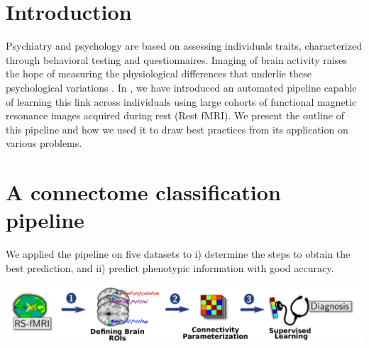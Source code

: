 \documentclass[portrait,a0,final]{a0poster} %
\begin{document}

\vspace{0.04\linewidth}

\centering
\Large %
\sffamily %


\begin{minipage}{0.98\linewidth}

\begin{minipage}[t]{0.48\linewidth}
\setlength{\parindent}{10mm} %













\section{Introduction}
Psychiatry and psychology are based on assessing individuals traits,
characterized through
behavioral testing and questionnaires. Imaging of brain activity raises the
hope of measuring
the physiological differences that underlie these psychological variations
\cite{miller}. In \cite{abraham}, we have
introduced an automated pipeline capable of learning this link across
individuals using large
cohorts of functional magnetic resonance images acquired during rest (Rest
fMRI). We present the outline of this pipeline
and how we used it to draw best practices from its application on various problems.


\vspace{0.8\sectionspace}
\section{A connectome classification pipeline}
We applied the pipeline on five datasets to i) determine the steps to obtain
the best
prediction, and ii) predict phenotypic information with good accuracy.

\begin{center}
\includegraphics[width=1\linewidth]{figures/functional_connectivity_pipeline.pdf}
\end{center}



\end{minipage}
\end{minipage}
\end{document}
